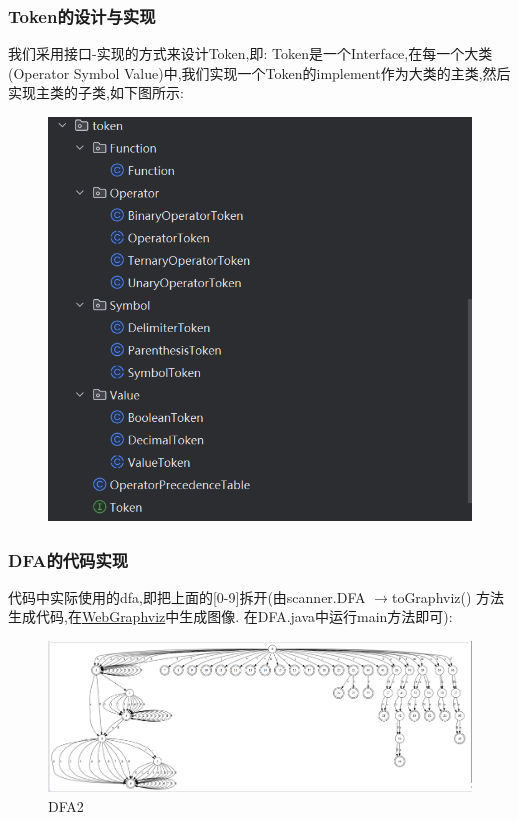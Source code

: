 \documentclass{article}
\begin{document}
\subsubsection{Token的设计与实现}
我们采用接口-实现的方式来设计Token,即:
Token是一个Interface,在每一个大类(Operator Symbol Value)中,我们实现一个Token的implement作为大类的主类,然后实现主类的子类,如下图所示:
\begin{figure}[H]
    \centering
    \includegraphics[width=\linewidth]{TokenIm.png}
    \caption{}
    \label{fig:TokenIm}
\end{figure}

\newpage
\subsubsection{DFA的代码实现}
代码中实际使用的dfa,即把上面的[0-9]拆开(由scanner.DFA $\rightarrow$toGraphviz() 方法生成代码,在\href{http://www.webgraphviz.com/}{WebGraphviz}中生成图像. 在DFA.java中运行main方法即可):

\begin{figure}[H]
    \centering
    \includegraphics[width=\linewidth]{DFA4.png}
    \caption{DFA2}
    \label{fig:DFA3}
\end{figure}
\end{document}
